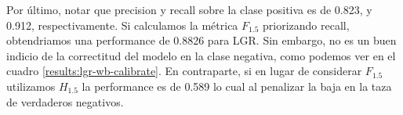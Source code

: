 Por último, notar que precision y recall sobre la clase positiva es de 0.823, y
0.912, respectivamente. Si calculamos la métrica $F_{1.5}$ priorizando recall,
obtendriamos una performance de 0.8826 para LGR. Sin embargo, no es un buen
indicio de la correctitud del modelo en la clase negativa, como podemos ver en
el cuadro \ref{results:lgr-wb-calibrate}. En contraparte, si en lugar de
considerar $F_{1.5}$ utilizamos $H_{1.5}$ la performance es de 0.589 lo cual
al penalizar la baja en la taza de verdaderos negativos.

\begin{table}[h!]
\centering
{}
 \caption{Resultados por esquema de acción del mejor modelo con codificación por word embeddings.}
 \label{results:lgr-wb-calibrate}
\end{table}

